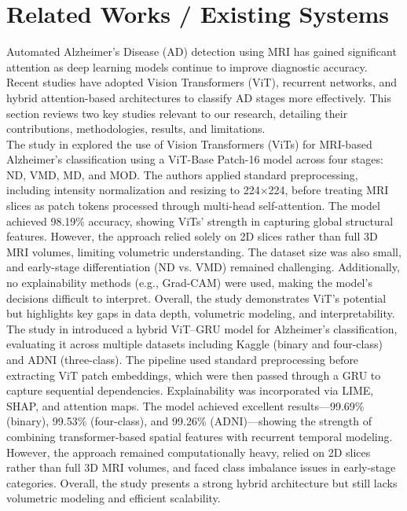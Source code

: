 \section{Related Works / Existing Systems}
Automated Alzheimer’s Disease (AD) detection using MRI has gained significant attention as deep learning models continue to improve diagnostic accuracy. Recent studies have adopted Vision Transformers (ViT), recurrent networks, and hybrid attention-based architectures to classify AD stages more effectively. This section reviews two key studies relevant to our research, detailing their contributions, methodologies, results, and limitations.\\

The study in \cite{kurniasari2024transforming} explored the use of Vision Transformers (ViTs) for MRI-based Alzheimer’s classification using a ViT-Base Patch-16 model across four stages: ND, VMD, MD, and MOD. The authors applied standard preprocessing, including intensity normalization and resizing to 224×224, before treating MRI slices as patch tokens processed through multi-head self-attention. The model achieved 98.19\% accuracy, showing ViTs’ strength in capturing global structural features. However, the approach relied solely on 2D slices rather than full 3D MRI volumes, limiting volumetric understanding. The dataset size was also small, and early-stage differentiation (ND vs. VMD) remained challenging. Additionally, no explainability methods (e.g., Grad-CAM) were used, making the model’s decisions difficult to interpret. Overall, the study demonstrates ViT’s potential but highlights key gaps in data depth, volumetric modeling, and interpretability.\\

The study in \cite{mahim2024unlocking} introduced a hybrid ViT–GRU model for Alzheimer’s classification, evaluating it across multiple datasets including Kaggle (binary and four-class) and ADNI (three-class). The pipeline used standard preprocessing before extracting ViT patch embeddings, which were then passed through a GRU to capture sequential dependencies. Explainability was incorporated via LIME, SHAP, and attention maps. The model achieved excellent results—99.69\% (binary), 99.53\% (four-class), and 99.26\% (ADNI)—showing the strength of combining transformer-based spatial features with recurrent temporal modeling. However, the approach remained computationally heavy, relied on 2D slices rather than full 3D MRI volumes, and faced class imbalance issues in early-stage categories. Overall, the study presents a strong hybrid architecture but still lacks volumetric modeling and efficient scalability.\\

